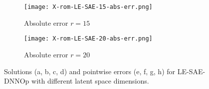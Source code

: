 \begin{figure}[!htb]
\begin{center}
        \begin{subfigure}[b]{0.23\textwidth}
            \begin{center}
                \texttt{[image: X-rom-LE-SAE-15-abs-err.png]}
            \end{center}
            \caption{Absolute error $r = 15$}
        \end{subfigure}    
        \begin{subfigure}[b]{0.23\textwidth}
            \begin{center}
                \texttt{[image: X-rom-LE-SAE-20-abs-err.png]}
            \end{center}
            \caption{Absolute error $r = 20$}
        \end{subfigure}
     \end{center}
     \caption[Solutions and pointwise errors for LE-SAE-DNNOp.]{Solutions (a, b, c, d) and pointwise errors (e, f, g, h) for LE-SAE-DNNOp with different latent space dimensions.}
        \label{fig: lesae-burger}
\end{figure}


